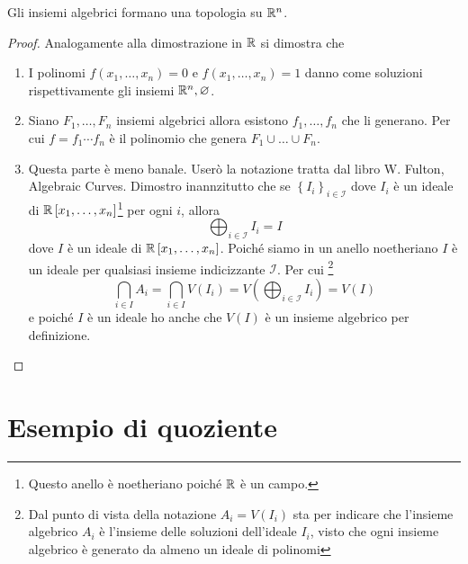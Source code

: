 \begin{theorem}
	Gli insiemi algebrici formano una topologia su $\mathbb{R}^n$.
\end{theorem}
\begin{proof}
	Analogamente alla dimostrazione in $\mathbb{R}$ si dimostra che
	\begin{enumerate}
		\item I polinomi $f(x_1, \dots, x_n) = 0$ e $f(x_1, \dots, x_n) = 1$ danno come soluzioni rispettivamente gli insiemi $\mathbb{R}^n, \varnothing$.
		\item Siano $F_1, \dots, F_n$ insiemi algebrici allora esistono $f_1, \dots, f_n$ che li generano. Per cui $f = f_1 \cdots f_n$ è il polinomio che genera $F_1 \cup \dots \cup F_n$.
		\item Questa parte è meno banale. Userò la notazione tratta dal libro W. Fulton, Algebraic Curves. Dimostro inannzitutto che se $\left\{I_i\right\}_{i \in \mathcal{I}}$ dove $I_i$ è un ideale di $\mathbb{R}\left[x_1, \dots, x_n\right]$\footnote{Questo anello è noetheriano poiché $\mathbb{R}$ è un campo.} per ogni $i$, allora 
		\begin{equation*}
			\bigoplus_{i \in \mathcal{I}} I_i = I
		\end{equation*}
		dove $I$ è un ideale di $\mathbb{R}\left[x_1, \dots, x_n\right]$. Poiché siamo in un anello noetheriano $I$ è un ideale per qualsiasi insieme indicizzante $\mathcal{I}$. 
		Per cui \footnote{Dal punto di vista della notazione $A_i = V(I_i)$ sta per indicare che l'insieme algebrico $A_i$ è l'insieme delle soluzioni dell'ideale $I_i$, visto che ogni insieme algebrico è generato da almeno un ideale di polinomi}
		\begin{equation*}
		\bigcap_{i \in I} A_i = \bigcap_{i \in I} V(I_i) = V\left(\bigoplus_{i \in \mathcal{I}} I_i\right) = V(I)
		\end{equation*}
		e poiché $I$ è un ideale ho anche che $V(I)$ è un insieme algebrico per definizione.
	\end{enumerate}	
\end{proof}

\section{Esempio di quoziente}

